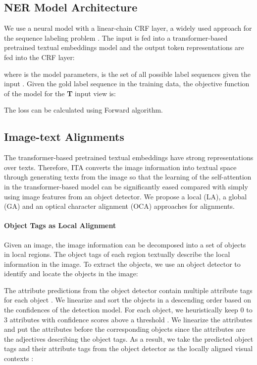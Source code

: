 \documentclass[11pt]{article}
\begin{document}
\subsection{NER Model Architecture}
We use a neural model with a linear-chain CRF layer, a widely used approach for the sequence labeling problem \citep{Huang2015BidirectionalLM,akbik-etal-2018-contextual,devlin-etal-2019-bert}. The input is fed into a transformer-based pretrained textual embeddings model and the output token representations  are fed into the CRF layer:

where  is the model parameters,  is the set of all possible label sequences given the input . Given the gold label sequence  in the training data, the objective function of the model for the \textbf{T} input view is:

The loss can be calculated using Forward algorithm.


\subsection{Image-text Alignments}
The transformer-based pretrained textual embeddings have strong representations over texts. Therefore, ITA converts the image information into textual space through generating texts from the image so that the learning of the self-attention in the transformer-based model can be significantly eased compared with simply using image features from an object detector. We propose a local (LA), a global (GA) and an optical character alignment (OCA) approaches for alignments.
\paragraph{Object Tags as Local Alignment} Given an image, the image information can be decomposed into a set of objects in local regions. The object tags of each region textually describe the local information in the image. To extract the objects, we use an object detector  to identify and locate the objects in the image: 

The attribute predictions from the object detector contain multiple attribute tags  for each object . We linearize and sort the objects in a descending order based on the confidences of the detection model. For each object, we heuristically keep 0 to 3 attributes with confidence scores above a threshold . We linearize the attributes and put the attributes before the corresponding objects since the attributes are the adjectives describing the object tags. 
As a result, we take the predicted  object tags  and their attribute tags  from the object detector as the locally aligned visual contexts :
\end{document}
